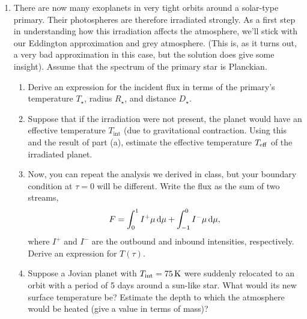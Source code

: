 \begin{enumerate}
\item There are now many exoplanets in very tight orbits around a solar-type primary. Their photospheres are therefore irradiated strongly. As a first step in understanding how this irradiation affects the atmosphere, we'll stick with our Eddington approximation and grey atmosphere. (This is, as it turns out, a very bad approximation in this case, but the solution does give some insight). Assume that the spectrum of the primary star is Planckian.  
\begin{enumerate}
\item Derive an expression for the incident flux in terms of the primary's temperature $T_{\star}$, radius $R_{\star}$, and distance $D_{\star}$. 
\item Suppose that if the irradiation were not present, the planet would have an effective temperature $T_{\mathrm{int}}$ (due to gravitational contraction.  Using this and the result of part (a), estimate the effective temperature $T_{\mathrm{eff}}$ of the irradiated planet.
\item Now, you can repeat the analysis we derived in class, but your boundary condition at $\tau = 0$ will be different. Write the flux as the sum of two streams,
\[ F = \int_{0}^{1}I^{+}\mu\,\mathrm{d}\mu + \int_{-1}^{0}I^{-}\mu\,\mathrm{d}\mu,\]
where $I^{+}$ and $I^{-}$ are the outbound and inbound intensities, respectively.  Derive an expression for $T(\tau)$. 
\item Suppose a Jovian planet with $T_{\mathrm{int}} = 75\,\mathrm{K}$ were suddenly relocated to an orbit with a period of 5 days around a sun-like star. What would its new surface temperature be? Estimate the depth to which the atmosphere would be heated (give a value in terms of mass)?
\end{enumerate}


\end{enumerate}
